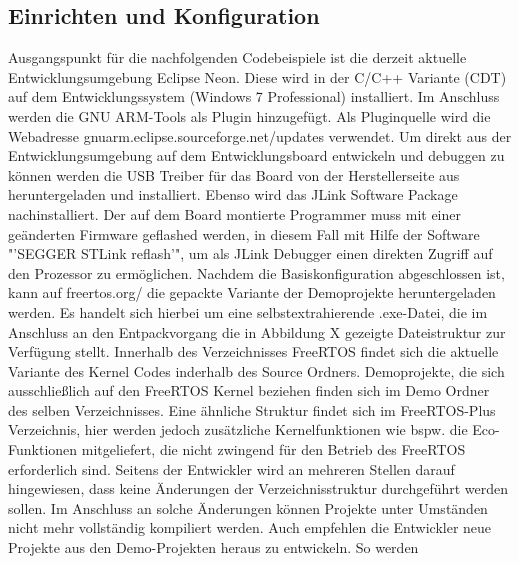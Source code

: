 \subsection{Einrichten und Konfiguration}
\label{sec:Einrichtung und Konfiguration}
Ausgangspunkt für die nachfolgenden Codebeispiele ist die derzeit aktuelle Entwicklungsumgebung Eclipse Neon. Diese wird in der C/C++ Variante (CDT) auf dem Entwicklungssystem (Windows 7 Professional) installiert. Im Anschluss werden die GNU ARM-Tools als Plugin hinzugefügt. Als Pluginquelle wird die Webadresse 
\newline
gnuarm.eclipse.sourceforge.net/updates verwendet. Um direkt aus der Entwicklungsumgebung auf dem Entwicklungsboard entwickeln und debuggen zu können werden die USB Treiber für das Board von der Herstellerseite aus heruntergeladen und installiert. Ebenso wird das JLink Software Package nachinstalliert. Der auf dem Board montierte Programmer muss mit einer geänderten Firmware geflashed werden, in diesem Fall mit Hilfe der Software "'SEGGER STLink reflash'", um als JLink Debugger einen direkten Zugriff auf den Prozessor zu ermöglichen.
Nachdem die Basiskonfiguration abgeschlossen ist, kann auf freertos.org/ die gepackte Variante der Demoprojekte heruntergeladen werden. Es handelt sich hierbei um eine selbstextrahierende .exe-Datei, die im Anschluss an den Entpackvorgang die in Abbildung X gezeigte Dateistruktur zur Verfügung stellt.
Innerhalb des Verzeichnisses FreeRTOS findet sich die aktuelle Variante des Kernel Codes inderhalb des Source Ordners. Demoprojekte, die sich ausschließlich auf den FreeRTOS Kernel beziehen finden sich im Demo Ordner des selben Verzeichnisses. Eine ähnliche Struktur findet sich im FreeRTOS-Plus Verzeichnis, hier werden jedoch zusätzliche Kernelfunktionen wie bspw. die Eco-Funktionen mitgeliefert, die nicht zwingend für den Betrieb des FreeRTOS erforderlich sind. 
Seitens der Entwickler wird an mehreren Stellen darauf hingewiesen, dass keine Änderungen der Verzeichnisstruktur durchgeführt werden sollen. Im Anschluss an solche Änderungen können Projekte unter Umständen nicht mehr vollständig kompiliert werden. Auch empfehlen die Entwickler neue Projekte aus den Demo-Projekten heraus zu entwickeln. So werden 
